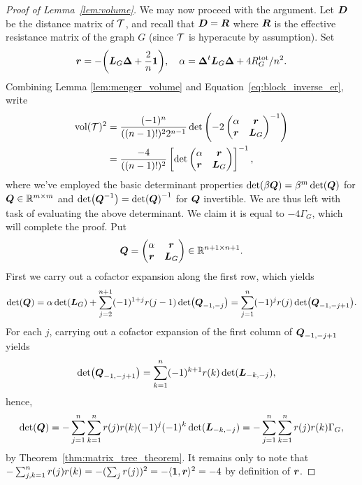 \begin{proof}[Proof of Lemma~\ref{lem:volume}]
	We may now proceed  with the argument. 
	Let $\vb*{D}$ be the distance matrix of $\mathcal{T}$, and recall that $\vb*{D}=\vb*{R}$ where $\vb*{R}$ is the effective resistance matrix of the graph $G$ (since $\mathcal{T}$ is hyperacute by assumption). 
	Set \[\vb*{r}=-\bigg(\vb*{L}_G\vb*{\Delta} + \frac{2}{n}\vb{1}\bigg), \quad \alpha = \vb*{\Delta}^t \vb*{L}_G\vb*{\Delta} + 4R^{\textnormal{tot}}_G/n^2.\] 
	Combining Lemma \ref{lem:menger_volume} and Equation~\eqref{eq:block_inverse_er}, write 
	\begin{align*}
	\textnormal{vol}(\mathcal{T})^2 &= \frac{(-1)^n }{((n-1)!)^2 2^{n-1}} \det\left(-2\begin{pmatrix}
	\alpha & \vb*{r} \\
	\vb*{r} & \vb*{L}_G
	\end{pmatrix}^{-1}\right) \\
	&= \frac{ -4}{((n-1)!)^2}\left[\det\begin{pmatrix}
	\alpha & \vb*{r} \\
	\vb*{r} & \vb*{L}_G
	\end{pmatrix}\right]^{-1},
	\end{align*}
	where we've employed the basic determinant properties $\det( \beta\vb*{Q})=\beta^{m}\det(\vb*{Q})$ for $\vb*{Q}\in\mathbb{R}^{m\times m}$ and $\det(\vb*{Q}^{-1})=\det(\vb*{Q})^{-1}$ for $\vb*{Q}$ invertible. We are thus left with task of evaluating the above determinant. We claim it is equal to $-4\Gamma_G$,  which will complete the proof. 
	Put 
	\[\vb*{Q} = \begin{pmatrix}
	\alpha & \vb*{r}\\ \vb*{r}& \vb*{L}_G
	\end{pmatrix}\in\mathbb{R}^{n+1\times n+1}.\]
	First we carry out a cofactor expansion along the first row, which yields 
	\begin{align*}
	\det(\vb*{Q}) = \alpha \det(\vb*{L}_G) + \sum_{j=2}^{n+1}(-1)^{1+j}r({j-1}) \det(\vb*{Q}_{-1,-j}) = \sum_{j=1}^n (-1)^j r(j) \det(\vb*{Q}_{-1,-j+1}).
	\end{align*}
	For each $j$, carrying out a cofactor expansion of the first column of $\vb*{Q}_{-1,-j+1}$ yields 
	\begin{align*}
	\det(\vb*{Q}_{-1,-j+1}) &= \sum_{k=1}^n (-1)^{k+1}r(k) \det(\vb*{L}_{-k,-j}),
	\end{align*}
	hence, 
	\begin{align*}
	\det(\vb*{Q}) = - \sum_{j=1}^n \sum_{k=1}^n r(j)r(k)(-1)^j(-1)^k  \det(\vb*{L}_{-k,-j}) = - \sum_{j=1}^n \sum_{k=1}^n r(j)r(k)\Gamma_G,
	\end{align*}
	by Theorem~\ref{thm:matrix_tree_theorem}. It remains only to note that 
	$-\sum_{j,k=1}^n r(j) r(k) = -(\sum_j r(j))^2 = - \langle \vb{1},\vb*{r}\rangle ^2 = - 4$ 
	by  definition  of $\vb*{r}$. 
\end{proof}

